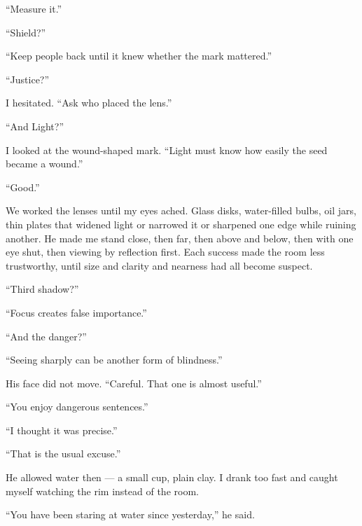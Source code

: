 ``Measure it.''\par

``Shield?''\par

``Keep people back until it knew whether the mark mattered.''\par

``Justice?''\par

I hesitated. ``Ask who placed the lens.''\par

``And Light?''\par

I looked at the wound-shaped mark. ``Light must know how easily the seed became a wound.''\par

``Good.''\par

We worked the lenses until my eyes ached. Glass disks, water-filled bulbs, oil jars, thin plates that widened light or narrowed it or sharpened one edge while ruining another. He made me stand close, then far, then above and below, then with one eye shut, then viewing by reflection first. Each success made the room less trustworthy, until size and clarity and nearness had all become suspect.\par

``Third shadow?''\par

``Focus creates false importance.''\par

``And the danger?''\par

``Seeing sharply can be another form of blindness.''\par

His face did not move. ``Careful. That one is almost useful.''\par

``You enjoy dangerous sentences.''\par

``I thought it was precise.''\par

``That is the usual excuse.''\par

He allowed water then --- a small cup, plain clay. I drank too fast and caught myself watching the rim instead of the room.\par

``You have been staring at water since yesterday,'' he said.\par

